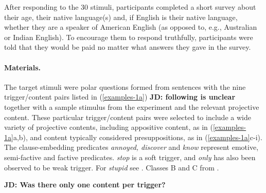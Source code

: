 \documentclass[11pt,fleqn]{article}
\newcommand{\6}{\mbox{$[\hspace*{-.6mm}[$}}
\newcommand{\9}{\mbox{$]\hspace*{-.6mm}]$}}
\begin{document}
After responding to the 30 stimuli, participants completed a short survey about their age, their native language(s) and, if English is their native language, whether they are a speaker of American English (as opposed to, e.g., Australian or Indian English). To encourage them to respond truthfully, participants were told that they would be paid no matter what answers they gave in the survey.

\paragraph{Materials.} The target stimuli were polar questions formed from sentences with the nine trigger/content pairs listed in (\ref{examples-1a}) {\bf JD: following is unclear} together with a sample stimulus from the experiment and the relevant projective content. These particular trigger/content pairs were selected to include a wide variety of projective contents, including appositive content, as in (\ref{examples-1a}a,b), and content typically considered presuppositions, as in (\ref{examples-1a}c-i). The clause-embedding predicates {\em annoyed, discover} and {\em know} represent emotive, semi-factive and factive predicates. {\em stop} is a soft trigger, and {\em only} has also been observed to be weak trigger. For {\em stupid} see \citealt{barker02}. Classes B and C from \citealt{brst-lang11}.

{\bf JD: Was there only one content per trigger?}
\end{document}
